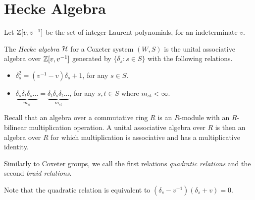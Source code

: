 \section{Hecke Algebra}


Let $\mathbb{Z}[v, v^{-1}]$ be the set of integer Laurent polynomials, for an indeterminate $v$.

\begin{definition}
    The \textit{Hecke algebra} $\mathcal{H}$ for a Coxeter system $(W,S)$ is the unital associative algebra over $\mathbb{Z}[v,v^{-1}]$ generated by $\{\delta_s : s \in S\}$ with the following relations.
    \begin{itemize}
        \item $\delta_s^2 = (v^{-1} - v)\delta_s + 1$, for any $s \in S$.
        \item $\underbrace{\delta_s \delta_t \delta_s...}_{m_{st}} = \underbrace{\delta_t \delta_s \delta_t...}_{m_{st}}$, for any $s,t \in S$ where $m_{st} < \infty$.
    \end{itemize}
\end{definition}

Recall that an algebra over a commutative ring $R$ is an $R$-module with an $R$-bilinear multiplication operation. A unital associative algebra over $R$ is then an algebra over $R$ for which multiplication is associative and has a multiplicative identity.

Similarly to Coxeter groups, we call the first relations \textit{quadratic relations} and the second \textit{braid relations}.


Note that the quadratic relation is equivalent to $(\delta_s - v^{-1})(\delta_s + v) = 0$.




